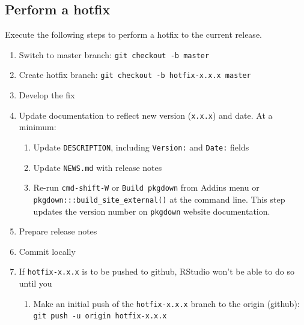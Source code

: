 \documentclass{article}
\begin{document}
\subsection{Perform a hotfix} 
\label{sec:hotfix}

Execute the following steps to perform a hotfix to the current release.

\begin{enumerate}

  \item Switch to master branch: \texttt{git checkout -b master} 

  \item Create hotfix branch: \texttt{git checkout -b hotfix-x.x.x master} 
	
  \item Develop the fix
	
  \item Update documentation to reflect new version (\texttt{x.x.x}) and date.
        At a minimum:
  \begin{enumerate}

    \item Update \texttt{DESCRIPTION}, including \texttt{Version:} and \texttt{Date:} fields 

    \item Update \texttt{NEWS.md} with release notes
	
	\item Re-run \texttt{cmd-shift-W} or \texttt{Build pkgdown} from Addins menu or \\
		  \verb#pkgdown:::build_site_external()# at the command line.
		  This step updates the version number on \texttt{pkgdown} website documentation. 

  \end{enumerate}
  \item Prepare release notes
  
  \item Commit locally
	
  \item If \texttt{hotfix-x.x.x} is to be pushed to github, RStudio won't be able to do so until you
  \begin{enumerate}

    \item Make an initial push of the \texttt{hotfix-x.x.x} branch
  	      to the origin (github):
  		  \texttt{git push -u origin hotfix-x.x.x} 
		  

\end{enumerate}
\end{enumerate}
\end{document}
